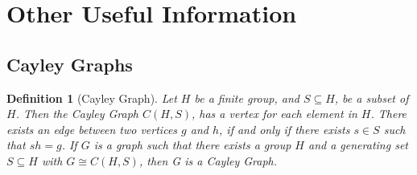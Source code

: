 \documentclass[12pt]{article}
\theoremstyle{parenbold}
\newtheorem{definition}{Definition}[section]
\begin{document}
\section{Other Useful Information}

\subsection{Cayley Graphs}
\begin{definition}[Cayley Graph]
Let $H$ be a finite group, and $S \subseteq H$, be a subset of $H$. Then the Cayley Graph $C(H,S)$, has a vertex for each element in $H$. There exists an edge between two vertices $g$ and $h$, if and only if there exists $s \in S$ such that $ sh = g$. If $G$ is a graph such that there exists a group $H$ and a generating set $S \subseteq H$ with $G \cong C(H,S)$, then G is a Cayley Graph. \cite{franccayley}

\end{definition}






\end{document}

